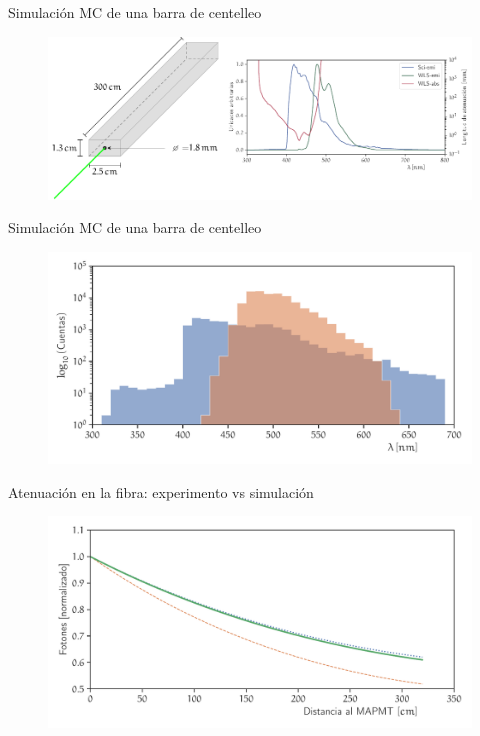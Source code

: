 \documentclass[spanish,aspectratio=169]{beamer}
\begin{document}
\begin{frame}{Simulación MC de una barra de centelleo}

\begin{figure}
        \centering
        \includegraphics[width=\textwidth]{scibar.pdf}
\end{figure}

\end{frame}

\begin{frame}{Simulación MC de una barra de centelleo}

\begin{figure}
        \centering
        \includegraphics[width=\textwidth]{sim-optics-spect.pdf}
\end{figure}

\end{frame}

\begin{frame}{Atenuación en la fibra: experimento vs simulación}

\begin{figure}
        \centering
        \includegraphics[width=\textwidth]{data_atlength.pdf}
\end{figure}

\end{frame}
\end{document}
